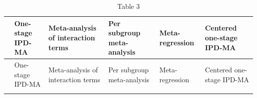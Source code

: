 \documentclass[]{article}
\begin{document}
\begin{longtable}[]{@{}llllll@{}}
\caption{Table 3}\tabularnewline
\toprule
\begin{minipage}[b]{0.16\columnwidth}\raggedright
\strut
\end{minipage} & \begin{minipage}[b]{0.10\columnwidth}\raggedright
One-stage IPD-MA\strut
\end{minipage} & \begin{minipage}[b]{0.17\columnwidth}\raggedright
Meta-analysis of interaction terms\strut
\end{minipage} & \begin{minipage}[b]{0.16\columnwidth}\raggedright
Per subgroup meta-analysis\strut
\end{minipage} & \begin{minipage}[b]{0.10\columnwidth}\raggedright
Meta-regression\strut
\end{minipage} & \begin{minipage}[b]{0.15\columnwidth}\raggedright
Centered one-stage IPD-MA\strut
\end{minipage}\tabularnewline
\midrule
\endfirsthead
\toprule
\begin{minipage}[b]{0.16\columnwidth}\raggedright
\strut
\end{minipage} & \begin{minipage}[b]{0.10\columnwidth}\raggedright
One-stage IPD-MA\strut
\end{minipage} & \begin{minipage}[b]{0.17\columnwidth}\raggedright
Meta-analysis of interaction terms\strut
\end{minipage} & \begin{minipage}[b]{0.16\columnwidth}\raggedright
Per subgroup meta-analysis\strut
\end{minipage} & \begin{minipage}[b]{0.10\columnwidth}\raggedright
Meta-regression\strut
\end{minipage} & \begin{minipage}[b]{0.15\columnwidth}\raggedright
Centered one-stage IPD-MA\strut
\end{minipage}\tabularnewline
\midrule
\endhead
\begin{minipage}[t]{0.16\columnwidth}\raggedright
\strut
\end{minipage} & \begin{minipage}[t]{0.10\columnwidth}\raggedright
\strut
\end{minipage} & \begin{minipage}[t]{0.17\columnwidth}\raggedright

\end{minipage}
\end{longtable}
\end{document}
